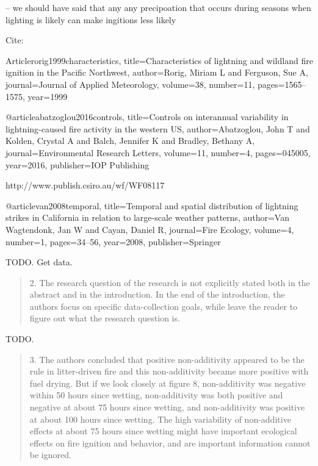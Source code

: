 \documentclass[letterpaper, 12pt]{letter}
\begin{document}
\begin{letter}{}
--  we should have said that any any precipoation that occurs during seasons when lighting is likely can make ingitions less likely

Cite:

Article{rorig1999characteristics,
  title={Characteristics of lightning and wildland fire ignition in the Pacific Northwest},
  author={Rorig, Miriam L and Ferguson, Sue A},
  journal={Journal of Applied Meteorology},
  volume={38},
  number={11},
  pages={1565--1575},
  year={1999}
}


@article{abatzoglou2016controls,
  title={Controls on interannual variability in lightning-caused fire activity in the western US},
  author={Abatzoglou, John T and Kolden, Crystal A and Balch, Jennifer K and Bradley, Bethany A},
  journal={Environmental Research Letters},
  volume={11},
  number={4},
  pages={045005},
  year={2016},
  publisher={IOP Publishing}
}

http://www.publish.csiro.au/wf/WF08117

@article{van2008temporal,
  title={Temporal and spatial distribution of lightning strikes in California in relation to large-scale weather patterns},
  author={Van Wagtendonk, Jan W and Cayan, Daniel R},
  journal={Fire Ecology},
  volume={4},
  number={1},
  pages={34--56},
  year={2008},
  publisher={Springer}
}




TODO.  Get data.


\begin{quote}
2. The research question of the research is not explicitly stated both in the abstract and in the introduction. In the end of the introduction, the authors focus on specific data-collection goals, while leave the reader to figure out what the research question is. 
\end{quote}

TODO.


\begin{quote}
3. The authors concluded that positive non-additivity appeared to be the rule in litter-driven fire and this non-additivity became more positive with fuel drying. But if we look closely at figure 8, non-additivity was negative within 50 hours since wetting, non-additivity was both positive and negative at about 75 hours since wetting, and non-additivity was positive at about 100 hours since wetting. The high variability of non-additive effects at about 75 hours since wetting might have important ecological effects on fire ignition and behavior, and are important information cannot be ignored.
\end{quote}



\end{letter}
\end{document}

